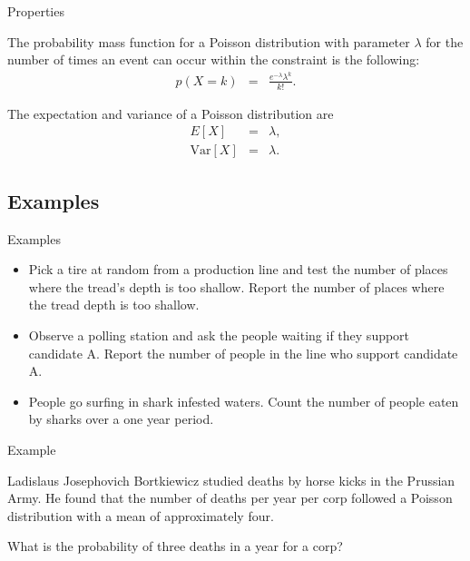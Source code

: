 \begin{frame}{Properties}

  The probability mass function for a Poisson distribution with
  parameter $\lambda$ for the number of times an event can occur
  within the constraint is the following:
  \begin{eqnarray*}
    p(X=k) & = & \frac{e^{-\lambda}\lambda^k}{k!}.
  \end{eqnarray*}

  The expectation and variance of a Poisson distribution are
  \begin{eqnarray*}
    E[X] & = & \lambda, \\
    \mathrm{Var}[X] & = & \lambda.
  \end{eqnarray*}

\end{frame}


\subsection{Examples}

\begin{frame}{Examples}

  \begin{itemize}
  \item Pick a tire at random from a production line and test the
    number of places where the tread's depth is too shallow. Report
    the number of places where the tread depth is too shallow.\\
  \item Observe a polling station and ask the people waiting if they
    support candidate A. Report the number of people in the line who
    support candidate A.
  \item People go surfing in shark infested waters. Count the number
    of people eaten by sharks over a one year period.
  \end{itemize}
  
\end{frame}

\begin{frame}{Example}

  \vfill

  Ladislaus Josephovich Bortkiewicz studied deaths by horse kicks in
  the Prussian Army. He found that the number of deaths per year per
  corp followed a Poisson distribution with a mean of approximately
  four.

  \vfill

  What is the probability of three deaths in a year for a corp?

  \vfill

\end{frame}


